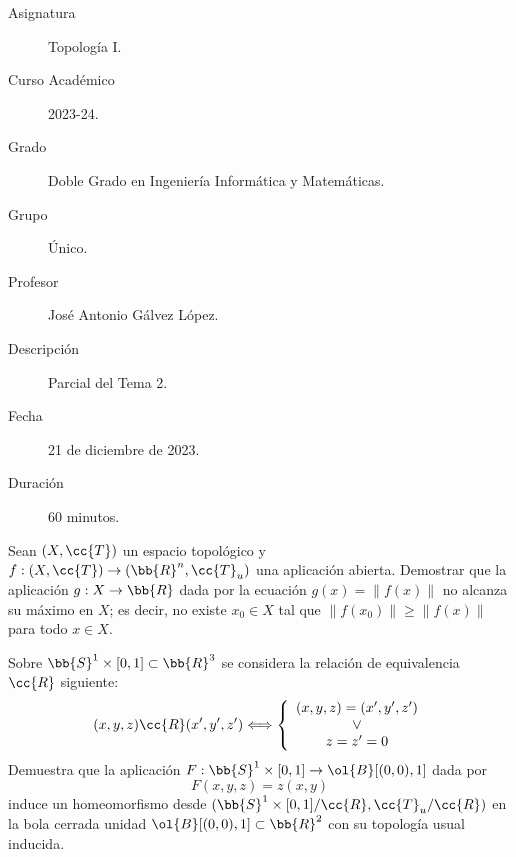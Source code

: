 \documentclass[12pt]{article}
\newcommand{\T}[0]{\cc{T}}
\begin{document}

    
    

    \begin{description}
        \item[Asignatura] Topología I.
        \item[Curso Académico] 2023-24.
        \item[Grado] Doble Grado en Ingeniería Informática y Matemáticas.
        \item[Grupo] Único.
        \item[Profesor] José Antonio Gálvez López.
        \item[Descripción] Parcial del Tema 2.
        \item[Fecha] 21 de diciembre de 2023.
        \item[Duración] 60 minutos.
    
    \end{description}
    \newpage
    
    \begin{ejercicio}[5 puntos]
        Sean $(X,\T)$ un espacio topológico y $f:(X,\T)\to (\bb{R}^n,\T_u)$ una aplicación abierta. Demostrar que la aplicación $g:X\to \bb{R}$ dada por la ecuación $g(x)=\|f(x)\|$ no alcanza su máximo en $X$; es decir, no existe $x_0\in X$ tal que $\|f(x_0)\|\geq \|f(x)\|$ para todo $x\in X$.
    \end{ejercicio}

    \begin{ejercicio}[5 puntos]
        Sobre $\bb{S}^1\times [0,1]\subset \bb{R}^3$ se considera la relación de equivalencia $\cc{R}$ siguiente:
        \begin{equation*}
            (x,y,z)\cc{R}(x',y',z')\Longleftrightarrow \left\{\begin{array}{c}
                (x,y,z)=(x',y',z') \\\lor\\
                z=z'=0
            \end{array}\right.
        \end{equation*}
        Demuestra que la aplicación $F:\bb{S}^1\times [0,1]\to \ol{B}[(0,0), 1]$ dada por
        \begin{equation*}
            F(x,y,z)=z(x,y)
        \end{equation*}
        induce un homeomorfismo desde $(\bb{S}^1\times [0,1]/\cc{R},\T_u/\cc{R})$ en la bola cerrada unidad $\ol{B}[(0,0), 1]\subset \bb{R}^2$ con su topología usual inducida.
    \end{ejercicio}
\end{document}
